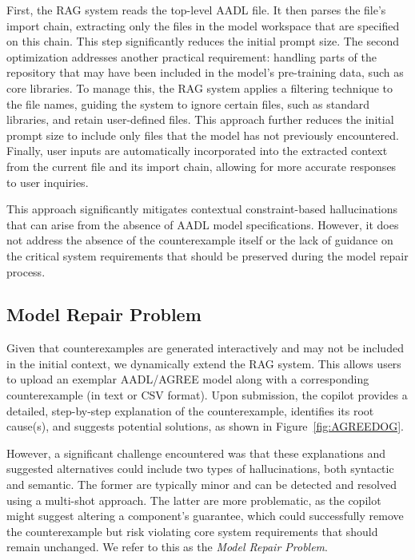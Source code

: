 First, the RAG system reads the top-level AADL file.  It then parses the file's import chain, extracting only the files in the model workspace that are specified on this chain. This step significantly reduces the initial prompt size. %
%
The second optimization addresses another practical requirement: handling parts of the repository that may have been included in the model's pre-training data, such as core libraries. To manage this, the RAG system applies a filtering technique to the file names, guiding the system to ignore certain files, such as standard libraries, and retain user-defined files. This approach further reduces the initial prompt size to include only files that the model has not previously encountered. Finally, user inputs are automatically incorporated into the extracted context from the current file and its import chain, allowing for more accurate responses to user inquiries.

This approach significantly mitigates contextual constraint-based hallucinations that can arise from the absence of AADL model specifications. However, it does not address the absence of the counterexample itself or the lack of guidance on the critical system requirements that should be preserved during the model repair process.
 

\subsection{Model Repair Problem}

Given that counterexamples are generated interactively and may not be included in the initial context, we dynamically extend the RAG system. This allows users to upload an exemplar AADL/AGREE model along with a corresponding counterexample (in text or CSV format). %
Upon submission, the copilot provides a detailed, step-by-step explanation of the counterexample, identifies its root cause(s), and suggests potential solutions, as shown in Figure~\ref{fig:AGREEDOG}. 


However, a significant challenge encountered was that these explanations and suggested alternatives could include two types of hallucinations, both syntactic and semantic. The former are typically minor and can be detected and resolved using a multi-shot approach. The latter are more problematic, as the copilot might suggest altering a component's guarantee, which could successfully remove the counterexample but risk violating core system requirements that should remain unchanged.  We refer to this as the \textit{Model Repair Problem}. 


